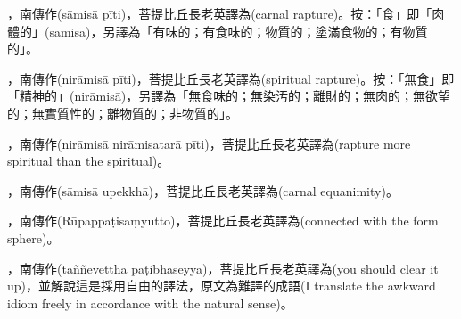\startitemgroup[noteitems]
\item{}，南傳作(sāmisā pīti)，菩提比丘長老英譯為(carnal rapture)。按：「食」即「肉體的」(sāmisa)，另譯為「有味的；有食味的；物質的；塗滿食物的；有物質的」。
\stopitemgroup

\startitemgroup[noteitems]
\item{}，南傳作(nirāmisā pīti)，菩提比丘長老英譯為(spiritual rapture)。按：「無食」即「精神的」(nirāmisā)，另譯為「無食味的；無染汚的；離財的；無肉的；無欲望的；無實質性的；離物質的；非物質的」。
\stopitemgroup

\startitemgroup[noteitems]
\item{}，南傳作(nirāmisā nirāmisatarā pīti)，菩提比丘長老英譯為(rapture more spiritual than the spiritual)。
\stopitemgroup

\startitemgroup[noteitems]
\item{}，南傳作(sāmisā upekkhā)，菩提比丘長老英譯為(carnal equanimity)。
\stopitemgroup

\startitemgroup[noteitems]
\item{}，南傳作(Rūpappaṭisaṃyutto)，菩提比丘長老英譯為(connected with the form sphere)。
\stopitemgroup

\startitemgroup[noteitems]
\item{}，南傳作(taññevettha paṭibhāseyyā)，菩提比丘長老英譯為(you should clear it up)，並解說這是採用自由的譯法，原文為難譯的成語(I translate the awkward idiom freely in accordance with the natural sense)。
\stopitemgroup

